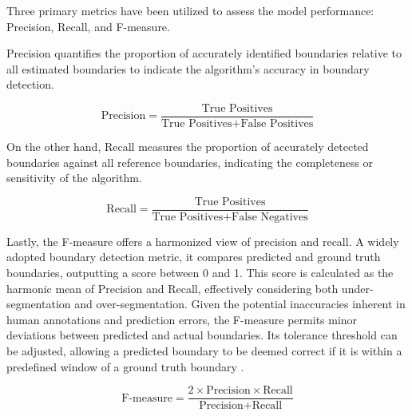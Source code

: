 Three primary metrics have been utilized to assess the model performance: Precision, Recall, and F-measure. 

Precision quantifies the proportion of accurately identified boundaries relative to all estimated boundaries to indicate the algorithm's accuracy in boundary detection.

\begin{equation}
\text{Precision} = \frac{\text{True Positives}}{\text{True Positives} + \text{False Positives}}
\end{equation}

On the other hand, Recall measures the proportion of accurately detected boundaries against all reference boundaries, indicating the completeness or sensitivity of the algorithm.

\begin{equation}
\text{Recall} = \frac{\text{True Positives}}{\text{True Positives} + \text{False Negatives}}
\end{equation}

Lastly, the F-measure offers a harmonized view of precision and recall. A widely adopted boundary detection metric, it compares predicted and ground truth boundaries, outputting a score between 0 and 1. This score is calculated as the harmonic mean of Precision and Recall, effectively considering both under-segmentation and over-segmentation. Given the potential inaccuracies inherent in human annotations and prediction errors, the F-measure permits minor deviations between predicted and actual boundaries. Its tolerance threshold can be adjusted, allowing a predicted boundary to be deemed correct if it is within a predefined window of a ground truth boundary \cite{Turnbull2007ABOOSTING, NietoPerceptualMusic}.

\begin{equation}
\text{F-measure} = \frac{2 \times \text{Precision} \times \text{Recall}}{\text{Precision} + \text{Recall}}
\end{equation}

\newpage